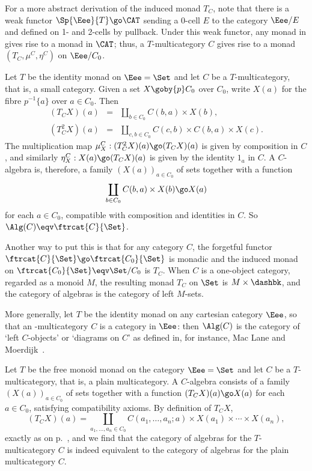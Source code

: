 For a more abstract derivation of the induced monad $T_C$, note that there
is a weak functor $\Sp{\Eee}{T} \go \CAT$ sending a 0-cell $E$ to the
category $\Eee/E$%
%
%
and defined on 1- and 2-cells by pullback.  Under this
weak functor, any monad in  gives rise to a monad in $\CAT$;
thus, a $T$-multicategory $C$ gives rise to a monad $(T_C, \mu^C, \eta^C)$
on $\Eee/C_0$.

\begin{example}	
Let $T$ be the identity monad on $\Eee=\Set$ and let $C$ be a
$T$-multicategory, that is, a small category.  Given a set $X\goby{p}C_0$
over $C_0$, write $X(a)$ for the fibre $p^{-1}\{a\}$ over $a\in C_0$.  Then
%
\begin{eqnarray*}
(T_C X)(a) 	&= 	&\coprod_{b\in C_0} C(b,a) \times X(b), 	\\
(T_C^2 X)(a) 	&= 	&\coprod_{c,b\in C_0} C(c,b) \times C(b,a) \times 
			 X(c).
\end{eqnarray*}
%
The multiplication map $\mu^C_X: (T_C^2 X)(a) \go (T_C X)(a)$ is given by
composition in $C$, and similarly $\eta^C_X: X(a) \go (T_C X)(a)$ is given
by the identity $1_a$ in $C$.  A $C$-algebra is, therefore, a family
$(X(a))_{a\in C_0}$ of sets together with a function
%
\begin{equation}	\label{eq:cat-action}
\coprod_{b\in C_0} C(b,a) \times X(b) 
\go
X(a)
\end{equation}
%
for each $a\in C_0$, compatible with composition and identities in $C$.  So
$\Alg(C) \eqv \ftrcat{C}{\Set}$.

Another way to put this is that for any category $C$, the forgetful functor
$\ftrcat{C}{\Set} \go \ftrcat{C_0}{\Set}$ is monadic and the induced monad
on $\ftrcat{C_0}{\Set} \eqv \Set/C_0$ is $T_C$.  When $C$ is a one-object
category, regarded as a monoid $M$, the resulting monad $T_C$ on $\Set$ is
$M\times\dashbk$, and the category of algebras is the category of left
$M$-sets.%
%
%
%
%

More generally, let $T$ be the identity monad on any cartesian category
$\Eee$, so that an \Cartpr-multicategory $C$ is a category in $\Eee$: then
$\Alg(C)$ is the category of `left $C$-objects' or `diagrams%
%
%
on $C$' as
defined in, for instance, Mac Lane and Moerdijk~\cite[V.7]{MM}.
\end{example}

\begin{example}	 
Let $T$ be the free monoid monad on the category $\Eee = \Set$ and let $C$
be a $T$-multicategory, that is, a plain multicategory.%
%
%
 A $C$-algebra 
consists of a family $(X(a))_{a\in C_0}$ of sets together with a function
$(T_C X)(a) \go X(a)$ for each $a \in C_0$, satisfying compatibility
axioms.  By definition of $T_C X$,
\[
(T_C X)(a) =
\coprod_{a_1, \ldots, a_n \in C_0} 
C(a_1, \ldots, a_n; a) \times X(a_1) \times \cdots \times X(a_n),
\]
exactly as on p.~\pageref{p:cl-endoftr}, and we find that the category of
algebras for the $T$-multicategory $C$ is indeed equivalent to the category
of algebras for the plain multicategory $C$.
\end{example}

